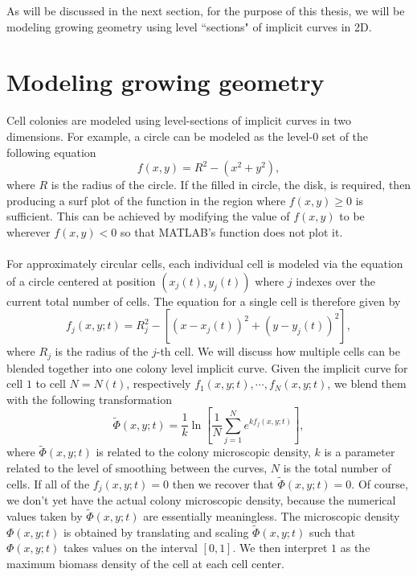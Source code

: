 As will be discussed in the next section, for the purpose of this thesis, we will be modeling growing geometry using level ``sections" of implicit curves in 2D.

\section{Modeling growing geometry }
Cell colonies are modeled using level-sections of implicit curves in two dimensions. For example, a circle can be modeled as the level-0 set of the following equation
\begin{equation*}
    f(x,y) =R^2-( x^2 + y^2),
\end{equation*}
where $R$ is the radius of the circle. If the filled in circle, the disk, is required, then producing a surf plot of the function in the region where $f(x,y) \geq 0$ is sufficient. This can be achieved by modifying the value of $f(x,y)$ to be  wherever $f(x,y)<0$ so that MATLAB's  function does not plot it.
\\
\\
For approximately circular cells, each individual cell is modeled via the equation of a circle centered at position $(x_j(t),y_j(t))$ where $j$ indexes over the current total number of cells. The equation for a single cell is therefore given by
\begin{equation*}
    f_j(x,y;t) =R_j^2- \left[ (x-x_j(t))^2 + (y-y_j(t))^2\right],
\end{equation*}
where $R_j$ is the radius of the $j$-th cell. We will discuss how multiple cells can be blended together into one colony level implicit curve. Given the implicit curve for cell $1$ to cell $N = N(t)$, respectively $f_1(x,y;t), \cdots, f_N(x,y; t)$, we blend them with the following transformation
\begin{equation*}
    \tilde{\Phi}(x,y;t) = \frac{1}{k}\ln{ \left[ \frac{1}{N} \sum_{j=1}^N{ e^{k f_j(x,y;t)}} \right]},
\end{equation*}
where $\tilde{\Phi}(x,y;t) $ is related to the colony microscopic density, $k$ is a parameter related to the level of smoothing between the curves, $N$ is the total number of cells. If all of the $f_j(x,y;t) =0$ then we recover that $\tilde{\Phi}(x,y;t) =0$. Of course, we don't yet have the actual colony microscopic density, because the numerical values taken by $\tilde{\Phi}(x,y;t) $ are essentially meaningless. The microscopic density $\Phi(x,y;t)$ is obtained by translating and scaling $\tilde{\Phi}(x,y;t) $ such that $\Phi(x,y;t) $ takes values on the interval $[0,1]$. We then interpret $1$ as the maximum biomass density of the cell at each cell center.

